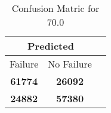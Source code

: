 \begin{table}[] 
\label{Table: Prediction Accuracy-DMD70.0OnlySunEKF-ignoreReflection-Reflection} 
\caption{Confusion Matric for 70.0} 
\centering 
\begin{tabular} 
 {@{}ccc@{}} 
\toprule 
\multicolumn{2}{c}{\textbf{Predicted}}
 \\ \midrule 
\multicolumn{1}{|c|}{Failure} & 
\multicolumn{1}{c|}{No Failure}
 \\ \midrule 
\multicolumn{1}{|c|}{\color{green}\textbf{61774}} & 
\multicolumn{1}{c|}{\color{red}\textbf{26092}}
 \\ \midrule 
\multicolumn{1}{|c|}{\color{red}\textbf{24882}} & 
\multicolumn{1}{c|}{\color{green}\textbf{57380}}
 \\ \bottomrule 
\end{tabular} 
\end{table} 

